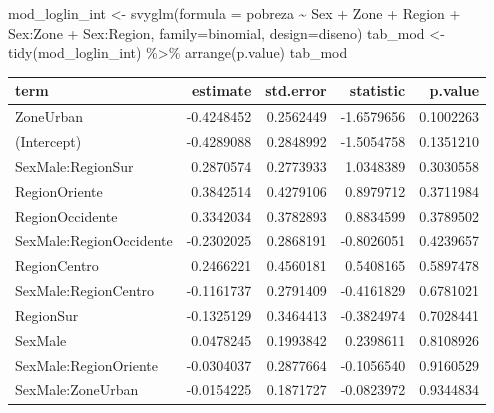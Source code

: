 \documentclass[
  12pt,
]{book}
\newenvironment{Shaded}{\begin{snugshade}}{\end{snugshade}}
\newcommand{\AttributeTok}[1]{\textcolor[rgb]{0.77,0.63,0.00}{#1}}
\newcommand{\FunctionTok}[1]{\textcolor[rgb]{0.00,0.00,0.00}{#1}}
\newcommand{\NormalTok}[1]{#1}
\newcommand{\OtherTok}[1]{\textcolor[rgb]{0.56,0.35,0.01}{#1}}
\newcommand{\SpecialCharTok}[1]{\textcolor[rgb]{0.00,0.00,0.00}{#1}}
\begin{document}
\begin{Shaded}
\begin{Highlighting}[]
\NormalTok{mod\_loglin\_int }\OtherTok{\textless{}{-}} \FunctionTok{svyglm}\NormalTok{(}\AttributeTok{formula =}\NormalTok{ pobreza }\SpecialCharTok{\textasciitilde{}}\NormalTok{ Sex }\SpecialCharTok{+}\NormalTok{ Zone }\SpecialCharTok{+}\NormalTok{ Region }\SpecialCharTok{+} 
\NormalTok{                           Sex}\SpecialCharTok{:}\NormalTok{Zone }\SpecialCharTok{+}\NormalTok{ Sex}\SpecialCharTok{:}\NormalTok{Region,}
                           \AttributeTok{family=}\NormalTok{binomial, }
                           \AttributeTok{design=}\NormalTok{diseno)}
\NormalTok{tab\_mod }\OtherTok{\textless{}{-}} \FunctionTok{tidy}\NormalTok{(mod\_loglin\_int) }\SpecialCharTok{\%\textgreater{}\%} \FunctionTok{arrange}\NormalTok{(p.value)}
\NormalTok{tab\_mod}
\end{Highlighting}
\end{Shaded}

\begin{tabular}{l|r|r|r|r}
\hline
term & estimate & std.error & statistic & p.value\\
\hline
ZoneUrban & -0.4248452 & 0.2562449 & -1.6579656 & 0.1002263\\
\hline
(Intercept) & -0.4289088 & 0.2848992 & -1.5054758 & 0.1351210\\
\hline
SexMale:RegionSur & 0.2870574 & 0.2773933 & 1.0348389 & 0.3030558\\
\hline
RegionOriente & 0.3842514 & 0.4279106 & 0.8979712 & 0.3711984\\
\hline
RegionOccidente & 0.3342034 & 0.3782893 & 0.8834599 & 0.3789502\\
\hline
SexMale:RegionOccidente & -0.2302025 & 0.2868191 & -0.8026051 & 0.4239657\\
\hline
RegionCentro & 0.2466221 & 0.4560181 & 0.5408165 & 0.5897478\\
\hline
SexMale:RegionCentro & -0.1161737 & 0.2791409 & -0.4161829 & 0.6781021\\
\hline
RegionSur & -0.1325129 & 0.3464413 & -0.3824974 & 0.7028441\\
\hline
SexMale & 0.0478245 & 0.1993842 & 0.2398611 & 0.8108926\\
\hline
SexMale:RegionOriente & -0.0304037 & 0.2877664 & -0.1056540 & 0.9160529\\
\hline
SexMale:ZoneUrban & -0.0154225 & 0.1871727 & -0.0823972 & 0.9344834\\
\hline
\end{tabular}
\end{document}

